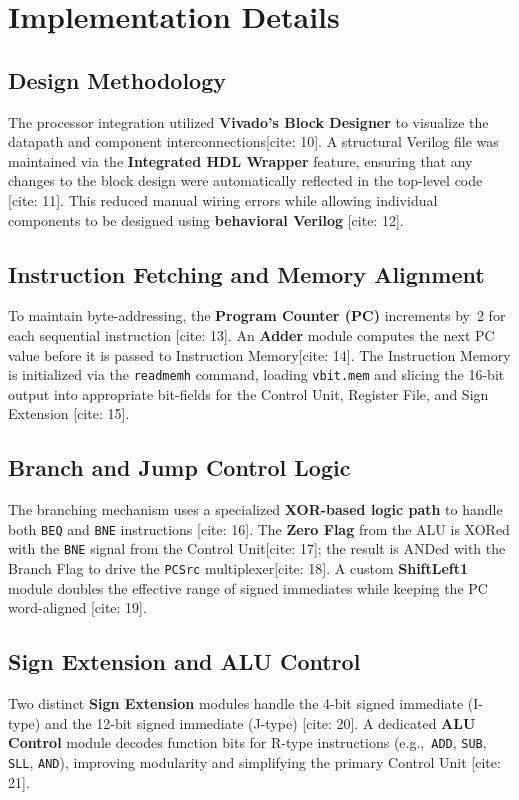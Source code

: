 \documentclass[12pt]{article}
\begin{document}
\section{Implementation Details}
\subsection{Design Methodology}
The processor integration utilized \textbf{Vivado's Block Designer} to visualize the
datapath and component interconnections[cite: 10]. A structural Verilog file was maintained via
the \textbf{Integrated HDL Wrapper} feature, ensuring that any changes to the block
design were automatically reflected in the top-level code \cite{xilinx2026}[cite: 11]. This
reduced manual wiring errors while allowing individual components to be designed using
\textbf{behavioral Verilog} \cite{patterson2020}[cite: 12].

\subsection{Instruction Fetching and Memory Alignment}
To maintain byte-addressing, the \textbf{Program Counter (PC)} increments by~2 for
each sequential instruction \cite{patterson2020}[cite: 13]. An \textbf{Adder} module computes
the next PC value before it is passed to Instruction Memory[cite: 14]. The Instruction Memory is
initialized via the \texttt{readmemh} command, loading \texttt{vbit.mem} and slicing
the 16-bit output into appropriate bit-fields for the Control Unit, Register File, and
Sign Extension \cite{patterson2020}[cite: 15].

\subsection{Branch and Jump Control Logic}
The branching mechanism uses a specialized \textbf{XOR-based logic path} to handle
both \texttt{BEQ} and \texttt{BNE} instructions \cite{patterson2020}[cite: 16]. The \textbf{Zero
Flag} from the ALU is XORed with the \texttt{BNE} signal from the Control Unit[cite: 17];
the result is ANDed with the Branch Flag to drive the \texttt{PCSrc} multiplexer[cite: 18]. A custom
\textbf{ShiftLeft1} module doubles the effective range of signed immediates while
keeping the PC word-aligned \cite{patterson2020}[cite: 19].

\subsection{Sign Extension and ALU Control}
Two distinct \textbf{Sign Extension} modules handle the 4-bit signed immediate
(I-type) and the 12-bit signed immediate (J-type) \cite{patterson2020}[cite: 20]. A dedicated
\textbf{ALU Control} module decodes function bits for R-type instructions
(e.g.,~\texttt{ADD}, \texttt{SUB}, \texttt{SLL}, \texttt{AND}), improving modularity
and simplifying the primary Control Unit \cite{patterson2020}[cite: 21].
\end{document}
